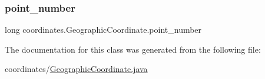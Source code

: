 \mbox{\label{classcoordinates_1_1_geographic_coordinate_a7d7384b678b1b189a8a023653f9d3c19}} 
\subsubsection{\texorpdfstring{point\+\_\+number}{point\_number}}
{\footnotesize\ttfamily long coordinates.\+Geographic\+Coordinate.\+point\+\_\+number\hspace{0.3cm}{\ttfamily [private]}}



The documentation for this class was generated from the following file\+:\begin{DoxyCompactItemize}
\item 
coordinates/\hyperlink{_geographic_coordinate_8java}{Geographic\+Coordinate.\+java}\end{DoxyCompactItemize}

